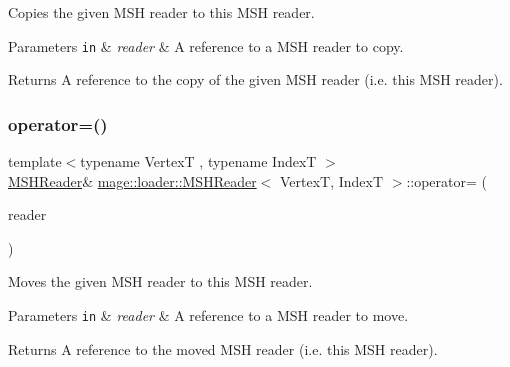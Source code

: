 Copies the given M\+SH reader to this M\+SH reader.


\begin{DoxyParams}[1]{Parameters}
\mbox{\tt in}  & {\em reader} & A reference to a M\+SH reader to copy. \\
\hline
\end{DoxyParams}
\begin{DoxyReturn}{Returns}
A reference to the copy of the given M\+SH reader (i.\+e. this M\+SH reader). 
\end{DoxyReturn}
\hypertarget{classmage_1_1loader_1_1_m_s_h_reader_a351f1e1c310ff472b454f3bb5d5b8fe9}{}\label{classmage_1_1loader_1_1_m_s_h_reader_a351f1e1c310ff472b454f3bb5d5b8fe9} 
\subsubsection{\texorpdfstring{operator=()}{operator=()}\hspace{0.1cm}{\footnotesize\ttfamily [2/2]}}
{\footnotesize\ttfamily template$<$typename VertexT , typename IndexT $>$ \\
\hyperlink{classmage_1_1loader_1_1_m_s_h_reader}{M\+S\+H\+Reader}\& \hyperlink{classmage_1_1loader_1_1_m_s_h_reader}{mage\+::loader\+::\+M\+S\+H\+Reader}$<$ VertexT, IndexT $>$\+::operator= (\begin{DoxyParamCaption}\item[{\hyperlink{classmage_1_1loader_1_1_m_s_h_reader}{M\+S\+H\+Reader}$<$ VertexT, IndexT $>$ \&\&}]{reader }\end{DoxyParamCaption})\hspace{0.3cm}{\ttfamily [delete]}}

Moves the given M\+SH reader to this M\+SH reader.


\begin{DoxyParams}[1]{Parameters}
\mbox{\tt in}  & {\em reader} & A reference to a M\+SH reader to move. \\
\hline
\end{DoxyParams}
\begin{DoxyReturn}{Returns}
A reference to the moved M\+SH reader (i.\+e. this M\+SH reader). 
\end{DoxyReturn}
\hypertarget{classmage_1_1loader_1_1_m_s_h_reader_aac059b991d1151473af2422be688552e}{}\label{classmage_1_1loader_1_1_m_s_h_reader_aac059b991d1151473af2422be688552e} 
